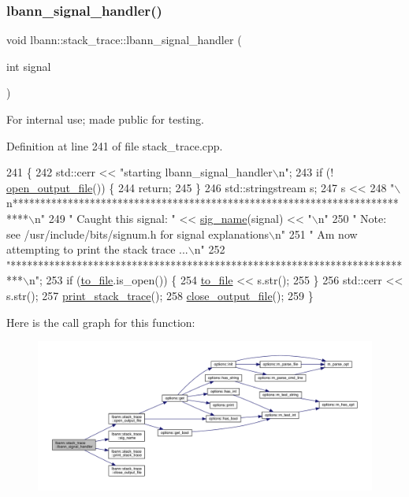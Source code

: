 \subsubsection{\texorpdfstring{lbann\+\_\+signal\+\_\+handler()}{lbann\_signal\_handler()}}
{\footnotesize\ttfamily void lbann\+::stack\+\_\+trace\+::lbann\+\_\+signal\+\_\+handler (\begin{DoxyParamCaption}\item[{int}]{signal }\end{DoxyParamCaption})}

For internal use; made public for testing. 

Definition at line 241 of file stack\+\_\+trace.\+cpp.


\begin{DoxyCode}
241                                       \{
242 std::cerr << \textcolor{stringliteral}{"starting lbann\_signal\_handler\(\backslash\)n"};
243   \textcolor{keywordflow}{if} (! \hyperlink{namespacelbann_1_1stack__trace_aa071d75a81128e2a8100d66529482842}{open\_output\_file}()) \{
244     \textcolor{keywordflow}{return};
245   \}
246   std::stringstream s;
247   s <<  
248          \textcolor{stringliteral}{"\(\backslash\)n**************************************************************************\(\backslash\)n"}
249          \textcolor{stringliteral}{" Caught this signal: "} << \hyperlink{namespacelbann_1_1stack__trace_a22d63f8c305ad282df5af296d61639e6}{sig\_name}(signal) << \textcolor{stringliteral}{"\(\backslash\)n"}
250          \textcolor{stringliteral}{" Note: see /usr/include/bits/signum.h for signal explanations\(\backslash\)n"}
251          \textcolor{stringliteral}{" Am now attempting to print the stack trace ...\(\backslash\)n"}
252          \textcolor{stringliteral}{"**************************************************************************\(\backslash\)n"};
253   \textcolor{keywordflow}{if} (\hyperlink{namespacelbann_1_1stack__trace_a6c838c74fec7cc57e5ccad283a8d282b}{to\_file}.is\_open()) \{
254     \hyperlink{namespacelbann_1_1stack__trace_a6c838c74fec7cc57e5ccad283a8d282b}{to\_file} << s.str();
255   \}
256   std::cerr << s.str();
257   \hyperlink{namespacelbann_1_1stack__trace_a52adbb11fce7541e2bc34b712d09e868}{print\_stack\_trace}();
258   \hyperlink{namespacelbann_1_1stack__trace_a45e4398bd4d0a7b9956107192a342b89}{close\_output\_file}();
259 \}
\end{DoxyCode}
Here is the call graph for this function\+:\nopagebreak
\begin{figure}[H]
\begin{center}
\leavevmode
\includegraphics[width=350pt]{namespacelbann_1_1stack__trace_a4bf58556b9c42ac8930c273a921172de_cgraph}
\end{center}
\end{figure}

